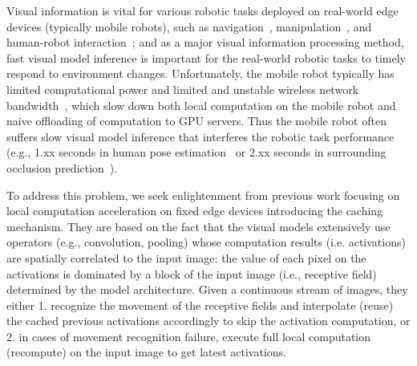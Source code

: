Visual information is vital for various robotic tasks deployed on real-world edge devices (typically mobile robots), such as navigation~\cite{ran2017convolutional}, manipulation~\cite{bayar2018constrained}, and human-robot interaction~\cite{wu2019weight};
and as a major visual information processing method, fast visual model inference is important for the real-world robotic tasks to timely respond to environment changes. 
Unfortunately, the mobile robot typically has limited computational power and limited and unstable wireless network bandwidth~\cite{yang2022mobile}, which slow down both local computation on the mobile robot and naive offloading of computation to GPU servers.
Thus the mobile robot often suffers slow visual model inference that interferes the robotic task performance (e.g., 1.xx seconds in human pose estimation~\cite{kapao} or 2.xx seconds in surrounding occlusion prediction~\cite{agrnav}).

To address this problem, we seek enlightenment from previous work focusing on local computation acceleration on fixed edge devices introducing the caching mechanism.
They are based on the fact that the visual models extensively use operators (e.g., convolution, pooling) whose computation results (i.e. activations) are spatially correlated to the input image: the value of each pixel on the activations is dominated by a block of the input image (i.e., receptive field) determined by the model architecture.
Given a continuous stream of images, they either 1. recognize the movement of the receptive fields and interpolate (reuse) the cached previous activations accordingly to skip the activation computation, or 2. in cases of movement recognition failure, execute full local computation (recompute) on the input image to get latest activations.

